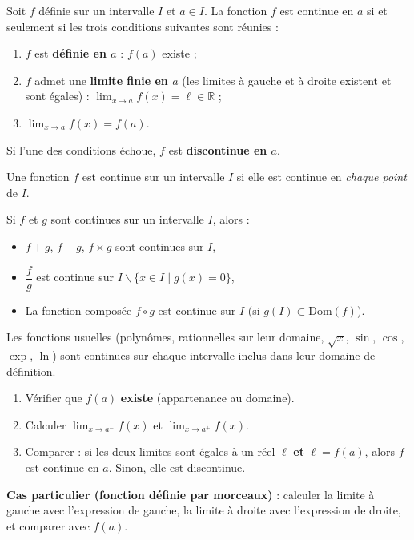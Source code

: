 \documentclass[11pt]{article}
\newcommand{\cle}[1]{{\popxbold\color{popdark}#1}}
\def\setminus{\mathbin{\backslash}}\let\smallsetminus\setminus
\begin{document}
\begin{definition}
Soit $f$ définie sur un intervalle $I$ et $a \in I$. La fonction $f$ est \cle{continue en $a$} si et seulement si les trois conditions suivantes sont réunies :
\begin{enumerate}
\item $f$ est \textbf{définie en $a$} : $f(a)$ existe ;
\item $f$ admet une \textbf{limite finie en $a$} (les limites à gauche et à droite existent et sont égales) : $\lim_{x\to a} f(x) = \ell \in \mathbb{R}$ ;
\item $\lim_{x\to a} f(x) = f(a)$.
\end{enumerate}
Si l'une des conditions échoue, $f$ est \textbf{discontinue en $a$}.
\end{definition}

\begin{definition}
Une fonction $f$ est \cle{continue sur un intervalle $I$} si elle est continue en \emph{chaque point} de $I$.
\end{definition}

\begin{propriete}
Si $f$ et $g$ sont continues sur un intervalle $I$, alors :
\begin{itemize}
\item $f+g$, $f-g$, $f \times g$ sont continues sur $I$,
\item $\dfrac{f}{g}$ est continue sur $I \setminus \{x \in I \mid g(x)=0\}$,
\item La fonction composée $f \circ g$ est continue sur $I$ (si $g(I) \subset \text{Dom}(f)$).
\end{itemize}
Les fonctions usuelles (polynômes, rationnelles sur leur domaine, $\sqrt{x}$, $\sin$, $\cos$, $\exp$, $\ln$) sont continues sur chaque intervalle inclus dans leur domaine de définition.
\end{propriete}

\begin{methode}
\begin{enumerate}
\item Vérifier que $f(a)$ \textbf{existe} (appartenance au domaine).
\item Calculer $\lim_{x\to a^-} f(x)$ et $\lim_{x\to a^+} f(x)$.
\item Comparer : si les deux limites sont égales à un réel $\ell$ \textbf{et} $\ell = f(a)$, alors $f$ est continue en $a$. Sinon, elle est discontinue.
\end{enumerate}
\textbf{Cas particulier (fonction définie par morceaux)} : calculer la limite à gauche avec l'expression de gauche, la limite à droite avec l'expression de droite, et comparer avec $f(a)$.
\end{methode}
\end{document}
